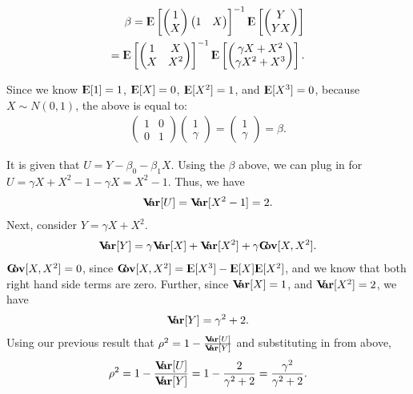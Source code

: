\documentclass[12pt]{paper}
\newcommand{\E}{{\rm I\kern-.3em E}}
\newcommand{\Var}{{\rm \textbf{V\kern-.3em ar}}}
\newcommand{\Cov}{{\rm \textbf{C\kern-.3em ov}}}
\begin{document}
\begin{align*}
\beta=\E \left[
\begin{pmatrix} 
1\\
X
\end{pmatrix}
\begin{pmatrix}
1 & X
\end{pmatrix}
\right]^{-1}
\E \left[
\begin{pmatrix}
Y\\
YX
\end{pmatrix}
\right]\\
=\E \left[
\begin{pmatrix}
1 & X\\
X & X^2
\end{pmatrix}
\right]^{-1}
\E \left[
\begin{pmatrix}
\gamma X+X^2\\
\gamma X^2 +X^3
\end{pmatrix}
\right].
\end{align*}

Since we know $\E[1]=1$, $\E[X]=0$, $\E[X^2]=1$, and $\E[X^3]=0$, because $X\sim N(0,1)$, the above is equal to:
\begin{align*}
\begin{pmatrix}
1 & 0\\
0 & 1
\end{pmatrix}
\begin{pmatrix}
1\\
\gamma
\end{pmatrix}
=
\begin{pmatrix}
1\\
\gamma
\end{pmatrix}=\beta.
\end{align*}

It is given that $U=Y-\beta_0-\beta_1X$. Using the $\beta$ above, we can plug in for $U=\gamma X+X^2-1-\gamma X= X^2-1$. Thus, we have
\begin{align*}
\Var[U]=\Var[X^2-1]=2.
\end{align*}
Next, consider $Y=\gamma X+X^2$.
\begin{align*}
\Var[Y]=\gamma \Var[X]+\Var[X^2]+\gamma \Cov[X,X^2].
\end{align*}
$\Cov[X,X^2]=0$, since $\Cov[X,X^2]=\E[X^3]-\E[X]\E[X^2]$, and we know that both right hand side terms are zero. Further, since $\Var[X]=1$, and $\Var[X^2]=2$, we have
\begin{align*}
\Var[Y]=\gamma^2+2.
\end{align*}
Using our previous result that $\rho^2=1-\frac{\Var[U]}{\Var[Y]}$ and substituting in from above,
\begin{align*}
\rho^2=1-\frac{\Var[U]}{\Var[Y]}=1-\frac{2}{\gamma^2+2}=\frac{\gamma^2}{\gamma^2 +2}.
\end{align*}
\end{document}
